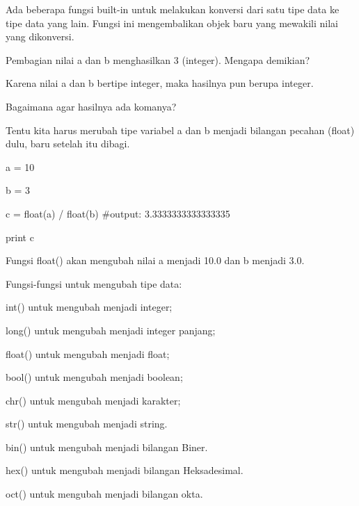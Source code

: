 \noindent 
Ada beberapa fungsi built-in untuk melakukan konversi dari satu tipe data ke tipe data yang lain. $  $Fungsi ini mengembalikan objek baru yang mewakili nilai yang dikonversi. \par
\vspace{12pt}
\noindent 
Pembagian nilai $  $a $  $dan $  $b $  $menghasilkan $  $3 $  $(integer). Mengapa demikian? \par
\vspace{12pt}
\noindent 
Karena nilai $  $a $  $dan $  $b $  $bertipe integer, maka hasilnya pun berupa integer. \par
\vspace{12pt}
\noindent 
Bagaimana agar hasilnya ada komanya? \par
\vspace{12pt}
\noindent 
Tentu kita harus merubah tipe variabel $  $a $  $dan $  $b $  $menjadi bilangan pecahan (float) dulu, baru setelah itu dibagi. \par
\vspace{12pt}
\noindent 
a = 10 \par
\noindent 
b = 3 \par
\noindent 
c = float(a) / float(b)  $  \#  $output: 3.3333333333333335 \par
\vspace{12pt}
\noindent 
print c \par
\vspace{12pt}
\noindent 
Fungsi $  $float() $  $akan mengubah nilai $  $a $  $menjadi $  $10.0 $  $dan $  $b $  $menjadi $  $3.0. \par
\vspace{12pt}
\noindent 
Fungsi-fungsi untuk mengubah tipe data: \par
\vspace{12pt}
\noindent 
int() $  $untuk mengubah menjadi integer; \par
\vspace{12pt}
\noindent 
long() $  $untuk mengubah menjadi integer panjang; \par
\vspace{12pt}
\noindent 
float() $  $untuk mengubah menjadi float; \par
\vspace{12pt}
\noindent 
bool() $  $untuk mengubah menjadi boolean; \par
\vspace{12pt}
\noindent 
chr() $  $untuk mengubah menjadi karakter; \par
\vspace{12pt}
\noindent 
str() $  $untuk mengubah menjadi string. \par
\vspace{12pt}
\noindent 
bin() $  $untuk mengubah menjadi bilangan Biner. \par
\vspace{12pt}
\noindent 
hex() $  $untuk mengubah menjadi bilangan Heksadesimal. \par
\vspace{12pt}
\noindent 
oct() $  $untuk mengubah menjadi bilangan okta. \par
\vspace{12pt}
\vspace{12pt}

